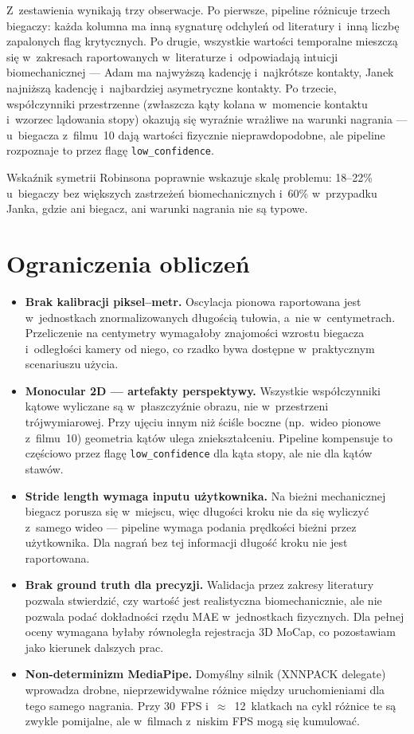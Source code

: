 Z~zestawienia wynikają trzy obserwacje. Po pierwsze, pipeline różnicuje trzech biegaczy: każda kolumna ma inną sygnaturę odchyleń od literatury i~inną liczbę zapalonych flag krytycznych. Po drugie, wszystkie wartości temporalne mieszczą się w~zakresach raportowanych w~literaturze i~odpowiadają intuicji biomechanicznej --- Adam ma najwyższą kadencję i~najkrótsze kontakty, Janek najniższą kadencję i~najbardziej asymetryczne kontakty. Po trzecie, współczynniki przestrzenne (zwłaszcza kąty kolana w~momencie kontaktu i~wzorzec lądowania stopy) okazują się wyraźnie wrażliwe na warunki nagrania --- u~biegacza z~filmu~10 dają wartości fizycznie nieprawdopodobne, ale pipeline rozpoznaje to przez flagę \texttt{low\_confidence}.

Wskaźnik symetrii Robinsona poprawnie wskazuje skalę problemu: 18--22\% u~biegaczy bez większych zastrzeżeń biomechanicznych i~60\% w~przypadku Janka, gdzie ani biegacz, ani warunki nagrania nie są typowe.

\section{Ograniczenia obliczeń}
\label{sec:ograniczenia-obliczen}

\begin{itemize}
    \item \textbf{Brak kalibracji piksel--metr.} Oscylacja pionowa raportowana jest w~jednostkach znormalizowanych długością tułowia, a~nie w~centymetrach. Przeliczenie na centymetry wymagałoby znajomości wzrostu biegacza i~odległości kamery od niego, co rzadko bywa dostępne w~praktycznym scenariuszu użycia.
    \item \textbf{Monocular 2D --- artefakty perspektywy.} Wszystkie współczynniki kątowe wyliczane są w~płaszczyźnie obrazu, nie w~przestrzeni trójwymiarowej. Przy ujęciu innym niż ściśle boczne (np.~wideo pionowe z~filmu~10) geometria kątów ulega zniekształceniu. Pipeline kompensuje to częściowo przez flagę \texttt{low\_confidence} dla kąta stopy, ale nie dla kątów stawów.
    \item \textbf{Stride length wymaga inputu użytkownika.} Na bieżni mechanicznej biegacz porusza się w~miejscu, więc długości kroku nie da się wyliczyć z~samego wideo --- pipeline wymaga podania prędkości bieżni przez użytkownika. Dla nagrań bez tej informacji długość kroku nie jest raportowana.
    \item \textbf{Brak ground truth dla precyzji.} Walidacja przez zakresy literatury pozwala stwierdzić, czy wartość jest realistyczna biomechanicznie, ale nie pozwala podać dokładności rzędu MAE w~jednostkach fizycznych. Dla pełnej oceny wymagana byłaby równoległa rejestracja 3D MoCap, co pozostawiam jako kierunek dalszych prac.
    \item \textbf{Non-determinizm MediaPipe.} Domyślny silnik (XNNPACK delegate) wprowadza drobne, nieprzewidywalne różnice między uruchomieniami dla tego samego nagrania. Przy 30~FPS i~$\approx$~12~klatkach na cykl różnice te są zwykle pomijalne, ale w~filmach z~niskim FPS mogą się kumulować.
\end{itemize}
